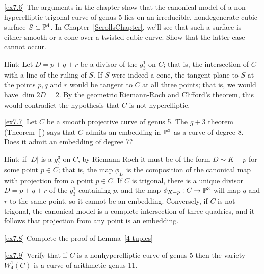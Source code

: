 \begin{exercise}\ref{ex7.6}
The arguments in the chapter show that the canonical model of a non-hyperelliptic trigonal curve of genus 5 lies on an irreducible, nondegenerate cubic surface $S \subset \PP^4$. In Chapter~\ref{ScrollsChapter}, we'll see that such a surface is either smooth or a cone over a twisted cubic curve. Show that the latter case cannot occur.
\end{exercise}

Hint: Let $D = p + q + r$ be a divisor of the $g^1_3$ on $C$; that is, the intersection of $C$ with a line of the ruling of $S$. If $S$ were indeed a cone, the tangent plane to $S$ at the points $p, q$ and $r$ would be tangent to $C$ at all three points; that is, we would have $\dim \overline{2D} = 2$. By the geometric Riemann-Roch and Clifford's theorem, this would contradict the hypothesis that $C$ is not hyperelliptic.


\begin{exercise}\ref{ex7.7}
Let $C$ be a smooth projective curve of genus 5. The $g+3$ theorem (Theorem~\ref{}) says that $C$ admits an embedding in $\PP^3$ as a curve of degree 8. Does it admit an embedding of degree 7?
\end{exercise}

Hint: if $|D|$ is a $g^3_7$ on $C$, by Riemann-Roch it must be of the form $D \sim K - p$ for some point $p \in C$; that is, the map $\phi_D$ is the composition of the canonical map with projection from a point $p \in C$. If $C$ is trigonal, there is a unique divisor $D = p + q + r$ of the $g^1_3$ containing $p$, and the map $\phi_{K-p} : C \to \PP^3$ will map $q$ and $r$ to the same point, so it cannot be an embedding. Conversely, if $C$ is not trigonal, the canonical model is a complete intersection of three quadrics, and it follows that projection from any point is an embedding.


\begin{exercise}\label{non-red 4-tuples}\ref{ex7.8}
Complete the proof of Lemma~\ref{4-tuples}
\end{exercise}

\begin{exercise}\ref{ex7.9}
Verify that if $C$ is a nonhyperelliptic curve of genus 5 then the variety $W^1_4(C)$ is a curve of arithmetic genus 11.
\end{exercise}

